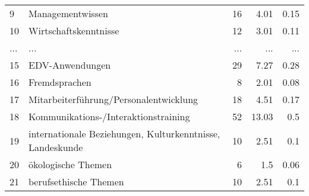 \begin{longtable}{lXrrr}
        9 & \multicolumn{1}{X}{Managementwissen} & %
          \num{16} &
          \num[round-mode=places,round-precision=2]{4.01} &
          \num[round-mode=places,round-precision=2]{0.15} \\
        10 & \multicolumn{1}{X}{Wirtschaftskenntnisse} & %
          \num{12} &
          \num[round-mode=places,round-precision=2]{3.01} &
          \num[round-mode=places,round-precision=2]{0.11} \\
       ... & ... & ... & ... & ... \\
        15 & \multicolumn{1}{X}{EDV-Anwendungen} & %
          \num{29} &
          \num[round-mode=places,round-precision=2]{7.27} &
          \num[round-mode=places,round-precision=2]{0.28} \\

        16 & \multicolumn{1}{X}{Fremdsprachen} & %
          \num{8} &
          \num[round-mode=places,round-precision=2]{2.01} &
          \num[round-mode=places,round-precision=2]{0.08} \\

        17 & \multicolumn{1}{X}{Mitarbeiterführung/Personalentwicklung} & %
          \num{18} &
          \num[round-mode=places,round-precision=2]{4.51} &
          \num[round-mode=places,round-precision=2]{0.17} \\

        18 & \multicolumn{1}{X}{Kommunikations-/Interaktionstraining} & %
          \num{52} &
          \num[round-mode=places,round-precision=2]{13.03} &
          \num[round-mode=places,round-precision=2]{0.5} \\

        19 & \multicolumn{1}{X}{internationale Beziehungen, Kulturkenntnisse, Landeskunde} & %
          \num{10} &
          \num[round-mode=places,round-precision=2]{2.51} &
          \num[round-mode=places,round-precision=2]{0.1} \\

        20 & \multicolumn{1}{X}{ökologische Themen} & %
          \num{6} &
          \num[round-mode=places,round-precision=2]{1.5} &
          \num[round-mode=places,round-precision=2]{0.06} \\

        21 & \multicolumn{1}{X}{berufsethische Themen} & %
          \num{10} &
          \num[round-mode=places,round-precision=2]{2.51} &
          \num[round-mode=places,round-precision=2]{0.1} \\


\end{longtable}
